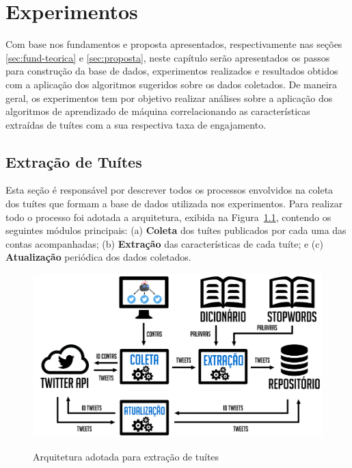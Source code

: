 \documentclass[oneside,openright,12pt]{ufsm_2015} %
\begin{document}

\chapter{Experimentos}
\label{sec:experimentos}

    \par Com base nos fundamentos e proposta apresentados, respectivamente nas seções \ref{sec:fund-teorica} e \ref{sec:proposta}, neste capítulo serão apresentados os passos para construção da base de dados, experimentos realizados e resultados obtidos com a aplicação dos algoritmos sugeridos sobre os dados coletados. De maneira geral, os experimentos tem por objetivo realizar análises sobre a aplicação dos algoritmos de aprendizado de máquina correlacionando as características extraídas de tuítes com a sua respectiva taxa de engajamento.


\section{Extração de Tuítes}
\label{sec:extracao-tweets}

    \par Esta seção é responsável por descrever todos os processos envolvidos na coleta dos tuítes que formam a base de dados utilizada nos experimentos. Para realizar todo o processo foi adotada a arquitetura, exibida na Figura~\ref{fig:arquitetura}, contendo os seguintes módulos principais: (a) \textbf{Coleta} dos tuítes publicados por cada uma das contas acompanhadas; (b) \textbf{Extração} das características de cada tuíte; e (c) \textbf{Atualização} periódica dos dados coletados.

    \begin{figure}[ht]
        \caption{Arquitetura adotada para extração de tuítes}
        \centering
        \includegraphics[width=1\textwidth]{figuras/arquitetura.png}
        \vspace{\baselineskip} %
        \label{fig:arquitetura}
    \end{figure}
    
\end{document}
